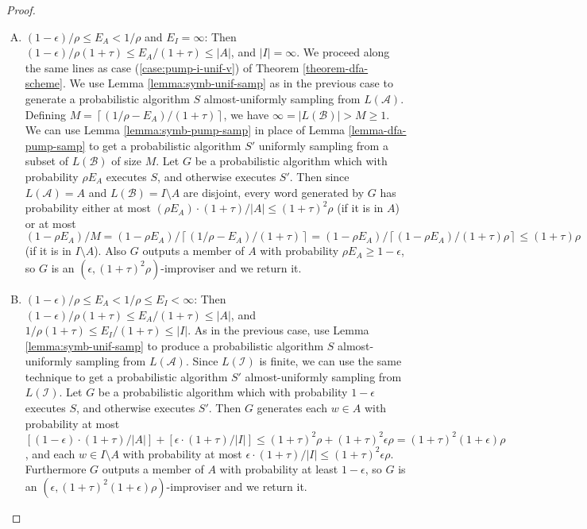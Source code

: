 \documentclass[a4paper,USenglish,numberwithinsect]{lipics}
\theoremstyle{plain}
\theoremstyle{definition}
\newcommand{\ceil}[1]{\left\lceil #1\right\rceil}
\newcommand{\improvs}{I}
\newcommand{\valids}{A}
\begin{document}
\begin{proof}
\begin{enumerate}[(A)]
\item $(1-\epsilon)/\rho \le E_{\valids} < 1/\rho$ and $E_{\improvs} = \infty$: Then $(1-\epsilon)/\rho(1+\tau) \le E_{\valids} / (1+\tau) \le |\valids|$, and $|\improvs| = \infty$. We proceed along the same lines as case (\ref{case:pump-i-unif-v}) of Theorem \ref{theorem-dfa-scheme}. We use Lemma \ref{lemma:symb-unif-samp} as in the previous case to generate a probabilistic algorithm $S$ almost-uniformly sampling from $L(\mathcal{\valids})$. Defining $M = \ceil{(1/\rho - E_{\valids})/(1+\tau)}$, we have $\infty = |L(\mathcal{B})| > M \ge 1$. We can use Lemma \ref{lemma:symb-pump-samp} in place of Lemma \ref{lemma-dfa-pump-samp} to get a probabilistic algorithm $S'$ uniformly sampling from a subset of $L(\mathcal{B})$ of size $M$. Let $G$ be a probabilistic algorithm which with probability $\rho E_{\valids}$ executes $S$, and otherwise executes $S'$. Then since $L(\mathcal{\valids}) = \valids$ and $L(\mathcal{B}) = \improvs \setminus \valids$ are disjoint, every word generated by $G$ has probability either at most $(\rho E_{\valids}) \cdot (1+\tau) / |\valids| \le (1+\tau)^2 \rho$ (if it is in $\valids$) or at most $(1 - \rho E_{\valids}) / M = (1 - \rho E_{\valids}) / \ceil{(1/\rho - E_{\valids})/(1+\tau)} = (1 - \rho E_{\valids}) / \ceil{(1 - \rho E_{\valids}) / (1+\tau)\rho} \le (1+\tau)\rho$ (if it is in $\improvs \setminus \valids$). Also $G$ outputs a member of $\valids$ with probability $\rho E_{\valids} \ge 1 - \epsilon$, so $G$ is an $(\epsilon, (1+\tau)^2 \rho)$-improviser and we return it.

\item $(1-\epsilon)/\rho \le E_{\valids} < 1/\rho \le E_{\improvs} < \infty$: Then $(1-\epsilon)/\rho(1+\tau) \le E_{\valids} / (1+\tau) \le |\valids|$, and $1/\rho(1+\tau) \le E_{\improvs} / (1+\tau) \le |\improvs|$. As in the previous case, use Lemma \ref{lemma:symb-unif-samp} to produce a probabilistic algorithm $S$ almost-uniformly sampling from $L(\mathcal{\valids})$. Since $L(\mathcal{\improvs})$ is finite, we can use the same technique to get a probabilistic algorithm $S'$ almost-uniformly sampling from $L(\mathcal{\improvs})$. Let $G$ be a probabilistic algorithm which with probability $1-\epsilon$ executes $S$, and otherwise executes $S'$. Then $G$ generates each $w \in \valids$ with probability at most $[ (1-\epsilon) \cdot (1+\tau) / |\valids| ] + [ \epsilon \cdot (1+\tau) / |\improvs| ] \le (1+\tau)^2 \rho + (1+\tau)^2 \epsilon \rho = (1+\tau)^2 (1+\epsilon) \rho$, and each $w \in \improvs \setminus \valids$ with probability at most $\epsilon \cdot (1+\tau) / |\improvs| \le (1+\tau)^2 \epsilon \rho$. Furthermore $G$ outputs a member of $\valids$ with probability at least $1-\epsilon$, so $G$ is an $(\epsilon, (1+\tau)^2 (1+\epsilon) \rho)$-improviser and we return it.


\end{enumerate}
\end{proof}
\end{document}
